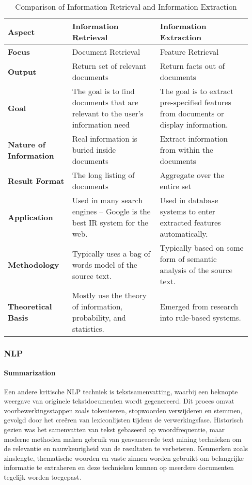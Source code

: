 \begin{table}[h!]
  \centering
  \begin{tabular}{|p{4cm}|p{5cm}|p{5cm}|}
  \hline
  \textbf{Aspect} & \textbf{Information Retrieval} & \textbf{Information Extraction} \\ \hline
  \textbf{Focus} & Document Retrieval & Feature Retrieval \\ \hline
  \textbf{Output} & Return set of relevant documents & Return facts out of documents \\ \hline
  \textbf{Goal} & The goal is to find documents that are relevant to the user’s information need & The goal is to extract pre-specified features from documents or display information. \\ \hline
  \textbf{Nature of Information} & Real information is buried inside documents & Extract information from within the documents \\ \hline
  \textbf{Result Format} & The long listing of documents & Aggregate over the entire set \\ \hline
  \textbf{Application} & Used in many search engines – Google is the best IR system for the web. & Used in database systems to enter extracted features automatically. \\ \hline
  \textbf{Methodology} & Typically uses a bag of words model of the source text. & Typically based on some form of semantic analysis of the source text. \\ \hline
  \textbf{Theoretical Basis} & Mostly use the theory of information, probability, and statistics. & Emerged from research into rule-based systems. \\ \hline
  \end{tabular}
  \caption{Comparison of Information Retrieval and Information Extraction}
  \label{tab:ir_vs_ie}
  \end{table}
  
\subsubsection{NLP}
\paragraph{Summarization}

Een andere kritische NLP techniek is tekstsamenvatting, waarbij een beknopte weergave van originele tekstdocumenten wordt gegenereerd. Dit proces omvat voorbewerkingsstappen zoals tokeniseren, stopwoorden verwijderen en stemmen, gevolgd door het creëren van lexiconlijsten tijdens de verwerkingsfase. Historisch gezien was het samenvatten van tekst gebaseerd op woordfrequentie, maar moderne methoden maken gebruik van geavanceerde text mining technieken om de relevantie en nauwkeurigheid van de resultaten te verbeteren. Kenmerken zoals zinslengte, thematische woorden en vaste zinnen worden gebruikt om belangrijke informatie te extraheren en deze technieken kunnen op meerdere documenten tegelijk worden toegepast\autocite{Talib2016TextMining}.

